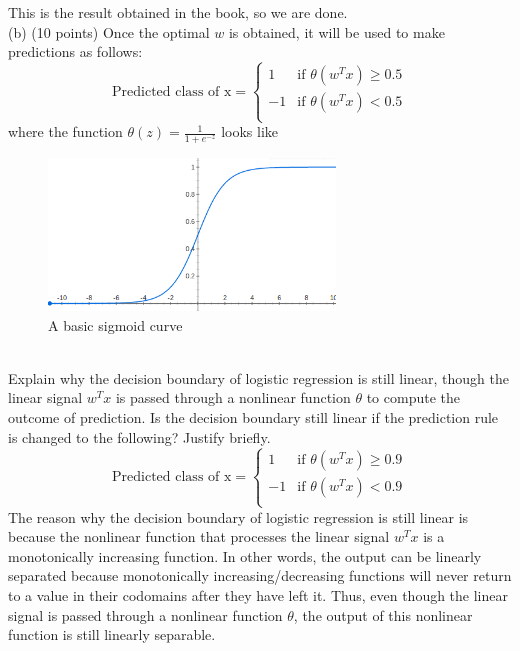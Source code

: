 \documentclass[12pt]{article}
\begin{document}
	This is the result obtained in the book, so we are done. \\
	(b) (10 points) Once the optimal $w$ is obtained, it will be used to make predictions as follows:
	\begin{equation*}
	\text{Predicted class of x} = 
	\begin{cases}
	1 & \text{if } \theta(w^Tx) \ge 0.5 \\
	-1 & \text{if } \theta(w^Tx) < 0.5 \\
	\end{cases}
	\end{equation*}
	where the function $\theta(z) = \frac{1}{1+e^{-z}}$ looks like \\
	\begin{figure}[h]
		\begin{center}
			\includegraphics[width=3in]{sigmoid.png}
			\caption{A basic sigmoid curve}
			\label{fig:sigmoidEx}
		\end{center}
	\end{figure}
	\\ 
	Explain why the decision boundary of logistic regression is still linear, though the linear signal $w^Tx$ is passed through a nonlinear function $\theta$ to compute the outcome of prediction.
	Is the decision boundary still linear if the prediction rule is changed to the following? Justify briefly.
	\begin{equation*}
	\text{Predicted class of x} = 
	\begin{cases}
	1 & \text{if } \theta(w^Tx) \ge 0.9 \\
	-1 & \text{if } \theta(w^Tx) < 0.9 \\
	\end{cases}
	\end{equation*}
	The reason why the decision boundary of logistic regression is still linear is because the nonlinear function that processes the linear signal $w^T x$ is a monotonically increasing function. In other words, the output can be linearly separated because monotonically increasing/decreasing functions will never return to a value in their codomains after they have left it. Thus, even though the linear signal is passed through a nonlinear function $\theta$, the output of this nonlinear function is still linearly separable. \\
\end{document}
